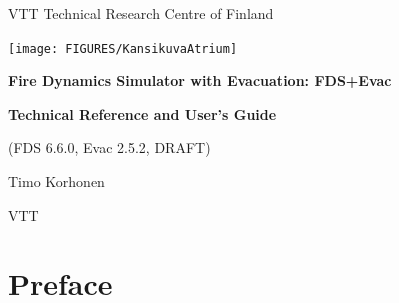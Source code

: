 \documentclass[12pt,a4paper,final,twoside]{stylevk}
\begin{document}


\newcommand{\Timts}[1]{\textnormal{\texttt{\textsl{#1}}}}
\newcommand{\Timtt}[1]{{\tt{#1}}}
\newcommand{\QS}{\hbox{\textquotesingle}}

\fancyhead{}
\fancyfoot[C]{\today}
\renewcommand{\headrulewidth}{0.0pt}
\renewcommand{\footrulewidth}{0.0pt}

\begin{titlepage}

  \thispagestyle{fancy}

  \begin{center}

    VTT Technical Research Centre of Finland

    \vspace{20mm}
   \centerline{\texttt{[image: FIGURES/KansikuvaAtrium]}}  
    \vspace{10mm}

    { \normalfont\fontsize{28}{42}\selectfont\bfseries\sffamily
      Fire Dynamics Simulator with Evacuation: FDS+Evac
    }

    \vspace{6mm}

    { \normalfont\fontsize{22}{28}\selectfont\bfseries\sffamily
      Technical Reference and User's Guide }

    { \normalfont\fontsize{14}{18}\selectfont\sffamily
      (FDS 6.6.0, Evac 2.5.2, DRAFT) }

    \vspace{15mm}

    { \normalfont\fontsize{14}{18}\selectfont\sffamily
      Timo Korhonen }

    \vspace{3mm}

    { \normalfont\fontsize{12}{16}\selectfont\sffamily
      VTT}

  \end{center}


\vspace{2cm}
    

\end{titlepage}

\setcounter{page}{4}

\newpage


\chapter*{Preface}
\end{document}
